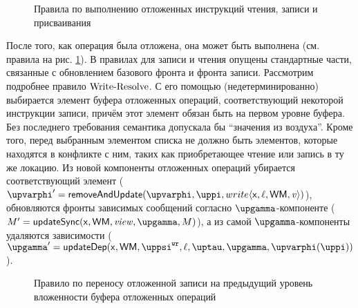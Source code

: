 \begin{figure}
\begin{mathpar}
\end{mathpar}
\caption{Правила по выполнению отложенных инструкций чтения, записи и присваивания}
\label{fig:resolve-sem}
\end{figure}

После того, как операция была отложена, она может быть выполнена (см. правила на рис. \ref{fig:resolve-sem}).
В правилах для записи и чтения опущены стандартные части, связанные с обновлением базового фронта и фронта записи.
Рассмотрим подробнее правило ${\rm Write\text{-}Resolve}$.
С его помощью (недетерминированно) выбирается элемент буфера отложенных операций, соответствующий некоторой инструкции
записи, причём этот элемент обязан быть на первом уровне буфера. Без последнего требования семантика допускала бы 
``значения из воздуха''.
Кроме того, перед выбранным элементом списка не должно быть элементов, которые находятся в конфликте с ним,
таких как приобретающее чтение или запись в ту же локацию.
Из новой компоненты отложенных операций убирается соответствующий элемент
($\stPhi' = \remove(\stPhi, \stpath, write\angled{\vName, \loc, \WM, \mvalSubst})$),
обновляются фронты зависимых сообщений согласно $\stGamma$-компоненте
($\stEta' = \updateSync(\vName, \WM, \stSigma, \stGamma, \stEta)$),
а из самой $\stGamma$-компоненты удаляются зависимости
($\stGamma' = \updateDep(\vName, \WM, \stPsiWrite, \loc, \stTau, \stGamma, \stPhi(\stpath))$).

\begin{figure}
\begin{mathpar}
\end{mathpar}
\caption{Правило по переносу отложенной записи на предыдущий уровень вложенности буфера отложенных операций}
\label{fig:promote-sem}
\end{figure}

